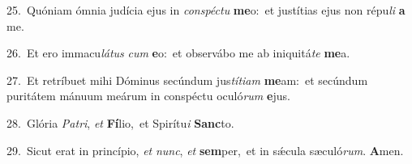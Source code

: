 {\numbfont\textcolor{\numbcolor}{25.}}~Quóniam ómnia judícia ejus in \textit{con}\-\textit{spéc}\textit{tu} \textbf{me}\-o:~\star et justítias ejus non répu\textit{li} \textbf{a} me.\par
{\numbfont\textcolor{\numbcolor}{26.}}~Et ero immacu\-\textit{lá}\-\textit{tus} \textit{cum} \textbf{e}\-o:~\star et observábo me ab iniquitá\textit{te} \textbf{me}\-a.\par
{\numbfont\textcolor{\numbcolor}{27.}}~Et retríbuet mihi Dóminus secúndum jus\-\textit{tí}\-\textit{ti}\textit{am} \textbf{me}\-am:~\star et secúndum puritátem mánuum meárum in conspéctu oculó\textit{rum} \textbf{e}\-jus.\par
{\numbfont\textcolor{\numbcolor}{28.}}~Glória \textit{Pa}\-\textit{tri}, \textit{et} \textbf{Fí}\-lio,~\star et Spirítu\textit{i} \textbf{Sanc}\-to.\par
{\numbfont\textcolor{\numbcolor}{29.}}~Sicut erat in princípio, \textit{et} \textit{nunc}\-, \textit{et} \textbf{sem}\-per,~\star et in sǽcula sæculó\-\textit{rum}\-. \textbf{A}\-men.\par

